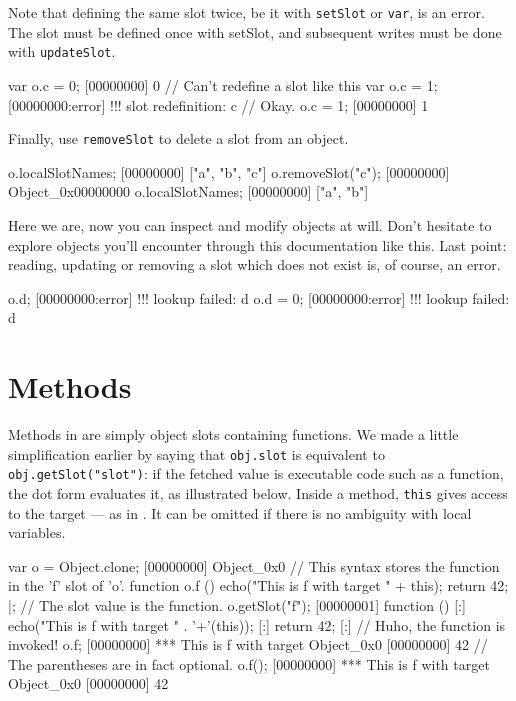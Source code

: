 Note that defining the same slot twice, be it with \lstinline{setSlot} or
\lstinline{var}, is an error. The slot must be defined once with setSlot,
and subsequent writes must be done with \lstinline{updateSlot}.

\begin{urbiscript}
var o.c = 0;
[00000000] 0
// Can't redefine a slot like this
var o.c = 1;
[00000000:error] !!! slot redefinition: c
// Okay.
o.c = 1;
[00000000] 1
\end{urbiscript}

Finally, use \lstinline{removeSlot} to delete a slot from an object.

\begin{urbiscript}
o.localSlotNames;
[00000000] ["a", "b", "c"]
o.removeSlot("c");
[00000000] Object_0x00000000
o.localSlotNames;
[00000000] ["a", "b"]
\end{urbiscript}

Here we are, now you can inspect and modify objects at will. Don't
hesitate to explore \us objects you'll encounter through this
documentation like this. Last point: reading, updating or removing a
slot which does not exist is, of course, an error.

\begin{urbiscript}
o.d;
[00000000:error] !!! lookup failed: d
o.d = 0;
[00000000:error] !!! lookup failed: d
\end{urbiscript}

\section{Methods}

Methods in \us are simply object slots containing functions. We made a
little simplification earlier by saying that \lstinline|obj.slot| is
equivalent to \lstinline|obj.getSlot("slot")|: if the fetched value is
executable code such as a function, the dot form evaluates it, as
illustrated below. Inside a method, \lstinline|this| gives access to
the target --- as in \Cxx.  It can be omitted if there is no ambiguity
with local variables.

\begin{urbiscript}[firstnumber=1]
var o = Object.clone;
[00000000] Object_0x0
// This syntax stores the function in the 'f' slot of 'o'.
function o.f ()
{
  echo("This is f with target " + this);
  return 42;
} |;
// The slot value is the function.
o.getSlot("f");
[00000001] function () {
[:]  echo("This is f with target " . '+'(this));
[:]  return 42;
[:]}
// Huho, the function is invoked!
o.f;
[00000000] *** This is f with target Object_0x0
[00000000] 42
// The parentheses are in fact optional.
o.f();
[00000000] *** This is f with target Object_0x0
[00000000] 42
\end{urbiscript}

